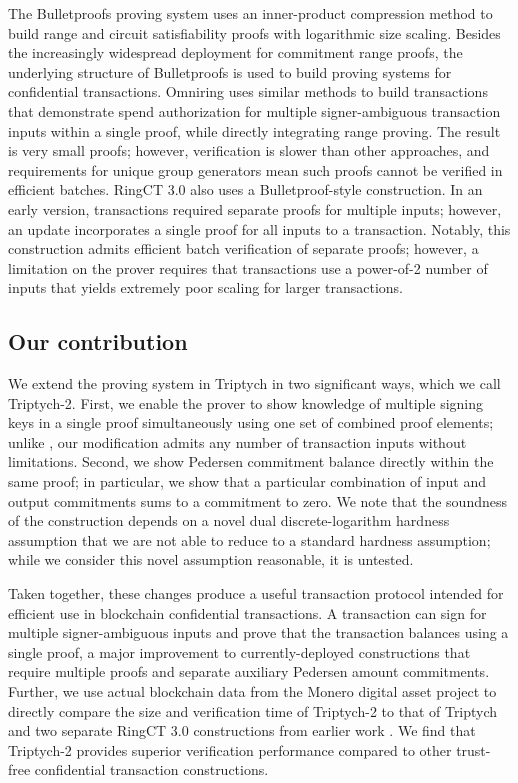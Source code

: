 \documentclass{article}
\theoremstyle{definition}
\begin{document}
The Bulletproofs \cite{bulletproofs} proving system uses an inner-product compression method to build range and circuit satisfiability proofs with logarithmic size scaling.
Besides the increasingly widespread deployment for commitment range proofs, the underlying structure of Bulletproofs is used to build proving systems for confidential transactions.
Omniring \cite{omniring} uses similar methods to build transactions that demonstrate spend authorization for multiple signer-ambiguous transaction inputs within a single proof, while directly integrating range proving.
The result is very small proofs; however, verification is slower than other approaches, and requirements for unique group generators mean such proofs cannot be verified in efficient batches.
RingCT 3.0 \cite{rct3} also uses a Bulletproof-style construction.
In an early version, transactions required separate proofs for multiple inputs; however, an update incorporates a single proof for all inputs to a transaction.
Notably, this construction admits efficient batch verification of separate proofs; however, a limitation on the prover requires that transactions use a power-of-2 number of inputs that yields extremely poor scaling for larger transactions.


\subsection{Our contribution}
We extend the proving system in Triptych \cite{triptych} in two significant ways, which we call Triptych-2.
First, we enable the prover to show knowledge of multiple signing keys in a single proof simultaneously using one set of combined proof elements; unlike \cite{rct3}, our modification admits any number of transaction inputs without limitations.
Second, we show Pedersen commitment balance directly within the same proof; in particular, we show that a particular combination of input and output commitments sums to a commitment to zero.
We note that the soundness of the construction depends on a novel dual discrete-logarithm hardness assumption that we are not able to reduce to a standard hardness assumption; while we consider this novel assumption reasonable, it is untested.

Taken together, these changes produce a useful transaction protocol intended for efficient use in blockchain confidential transactions.
A transaction can sign for multiple signer-ambiguous inputs and prove that the transaction balances using a single proof, a major improvement to currently-deployed constructions that require multiple proofs and separate auxiliary Pedersen amount commitments.
Further, we use actual blockchain data from the Monero digital asset project to directly compare the size and verification time of Triptych-2 to that of Triptych and two separate RingCT 3.0 constructions from earlier work \cite{triptych,rct3,lelantus}.
We find that Triptych-2 provides superior verification performance compared to other trust-free confidential transaction constructions.
\end{document}
